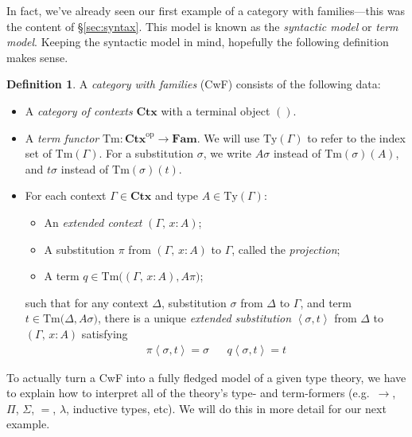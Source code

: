 \documentclass{article}
\theoremstyle{definition}
\newtheorem{definition}{Definition}[section]
\newcommand{\emp}{()}%
\newcommand{\comp}[2]{#2#1}%
\newcommand{\substType}[2]{#2#1}%
\newcommand{\substTerm}[2]{#2#1}%
\newcommand{\extsub}[2]{\ang{#1,#2}}
\newcommand{\C}{\mathbf{Ctx}}
\newcommand{\Fam}{\mathbf{Fam}}
\newcommand{\Ty}{\mathrm{Ty}}
\newcommand{\Tm}{\mathrm{Tm}}
\newcommand{\op}[1]{{#1}^\mathrm{op}}           %
\newcommand{\ang}[1]{\left\langle #1 \right\rangle}
\begin{document}
In fact, we've already seen our first example of a category with families---this was the content of \S\ref{sec:syntax}. This model is known as the \textit{syntactic model} or \textit{term model}. Keeping the syntactic model in mind, hopefully the following definition makes sense.

\begin{definition}\label{defn:cwf}
    A \textit{category with families} (CwF) consists of the following data:
    \begin{itemize}
        \item A \textit{category of contexts} $\C$ with a terminal object $\emp$. %
        
        \item A \textit{term functor} $\Tm\colon \op{\C} \to \Fam$. We will use $\Ty(\Gamma)$ to refer to the index set of $\Tm(\Gamma)$. For a substitution $\sigma$, we write $\substType{\sigma}{A}$ instead of $\Tm(\sigma)(A)$, and $\substType{\sigma}{t}$ instead of $\Tm(\sigma)(t)$.
        
        \item For each context $\Gamma \in \C$ and type $A \in \Ty(\Gamma)$:
        \begin{itemize}
            \item An \textit{extended context} $(\Gamma,\, x : A)$;
            
            \item A substitution $\pi$ from $(\Gamma,\, x : A)$ to $\Gamma$, called the \textit{projection};
            
            \item A term $q \in \Tm \big( (\Gamma,\, x : A), \substType{\pi}{A} \big)$;
        \end{itemize}
        such that for any context $\Delta$, substitution $\sigma$ from $\Delta$ to $\Gamma$, and term $t \in \Tm \big( \Delta, \substType{\sigma}{A} \big)$, there is a unique \textit{extended substitution} $\extsub{\sigma}{t}$ from $\Delta$ to $(\Gamma,\, x : A)$ satisfying
        \begin{align*}
            \comp{\extsub{\sigma}{t}}{\pi} = \sigma & & \substTerm{\extsub{\sigma}{t}}{q} = t
        \end{align*}
    \end{itemize}
\end{definition}

To actually turn a CwF into a fully fledged model of a given type theory, we have to explain how to interpret all of the theory's type- and term-formers (e.g.\ $\to$, $\Pi$, $\Sigma$, $=$, $\lambda$, inductive types, etc). We will do this in more detail for our next example.
\end{document}

